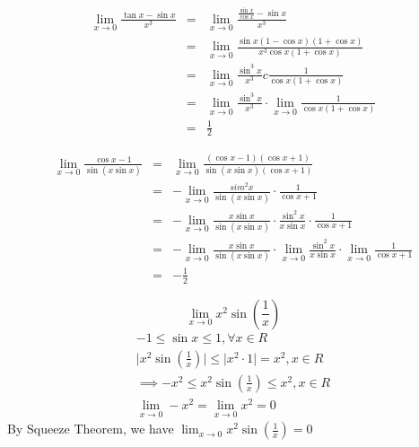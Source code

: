 \begin{eg} 
$$\begin{array}{rcl}
\displaystyle \lim_{x \to 0} \frac{\tan x - \sin x}{x^3} & = & \displaystyle \lim_{x \to 0} \frac{\frac{\sin x}{\cos x} - \sin x}{x^3}\\
& = & \displaystyle \lim_{x \to 0} \frac{\sin x (1 - \cos x)(1 + \cos x)}{x^3 \cos x (1 + \cos x)}\\
& = & \displaystyle \lim_{x \to 0} \frac{\sin ^3 x}{x^3}c\frac{1}{\cos x (1 + \cos x)}\\
& = & \displaystyle \lim_{x \to 0} \frac{\sin ^3 x}{x^3} \cdot \lim_{x \to 0} \frac{1}{\cos x (1 + \cos x)}\\
& = & \displaystyle \frac{1}{2}
\end{array}$$
\end{eg}
\begin{eg} 
$$\begin{array}{rcl}
\displaystyle \lim_{x \to 0} \frac{\cos x -1}{\sin(x \sin x)} & = & \displaystyle \lim_{x \to 0} \frac{(\cos x -1)(\cos x +1)}{\sin(x \sin x)(\cos x +1)}\\
& = & \displaystyle -\lim_{x \to 0} \frac{sim^2 x}{\sin (x \sin x)} \cdot \frac{1}{\cos x + 1}\\
& = & \displaystyle -\lim_{x \to 0} \frac{x \sin x}{\sin (x \sin x)} \cdot \frac{\sin ^2 x}{x \sin x} \cdot \frac{1}{\cos x + 1}\\
& = & \displaystyle -\lim_{x \to 0} \frac{x \sin x}{\sin (x \sin x)} \cdot \lim_{x \to 0} \frac{\sin ^2 x}{x \sin x} \cdot \lim_{x \to 0} \frac{1}{\cos x + 1}\\
& = & \displaystyle -\frac{1}{2}
\end{array}$$
\end{eg}
\begin{eg} 
$$\lim_{x \to 0} x^2 \sin (\frac{1}{x})$$
$$\begin{array}{c}
-1 \leq \sin x \leq 1, \forall x \in R\\
\displaystyle \Big| x^2 \sin (\frac{1}{x}) \Big| \leq \mid x^2 \cdot 1 \mid = x^2, x \in R\\
\displaystyle \implies - x^2 \leq x^2 \sin (\frac{1}{x}) \leq x^2, x\in R\\
\displaystyle \lim_{x \to 0} - x^2 = \lim_{x \to 0} x^2 = 0
\end{array}$$
By Squeeze Theorem, we have $\displaystyle \lim_{x \to 0} x^2 \sin (\frac{1}{x}) = 0$
\end{eg}

